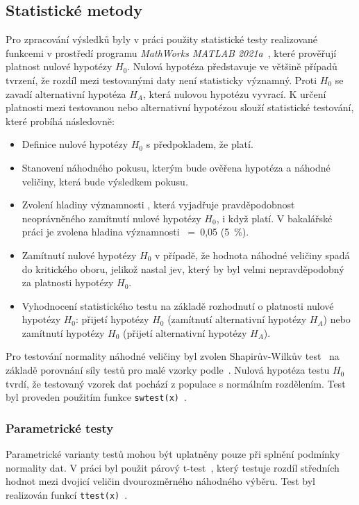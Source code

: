 \subsection{Statistické metody}
\label{section:statistical_methods}
Pro zpracování výsledků byly v práci použity statistické testy realizované
funkcemi v prostředí programu \textit{MathWorks MATLAB 2021a}~\cite{MATLAB},
které prověřují platnost nulové hypotézy $H_0$. Nulová hypotéza představuje ve
většině případů tvrzení, že rozdíl mezi testovanými daty není statisticky
významný. Proti $H_0$ se zavadí alternativní hypotéza $H_A$, která nulovou
hypotézu vyvrací. K určení platnosti mezi testovanou nebo alternativní hypotézou
slouží statistické testování, které probíhá následovně:
\begin{itemize}
    \item Definice nulové hypotézy $H_0$ s předpokladem, že platí.
    \item Stanovení náhodného pokusu, kterým bude ověřena hypotéza a náhodné
          veličiny, která bude výsledkem pokusu.
    \item Zvolení hladiny významnosti \textalpha, která vyjadřuje
          pravděpodobnost neoprávněného zamítnutí nulové hypotézy $H_0$, i když platí.
          V bakalářské práci je zvolena hladina významnosti \textalpha~=~0,05 (5~\%).
    \item Zamítnutí nulové hypotézy $H_0$ v případě, že hodnota náhodné veličiny
          spadá do kritického oboru, jelikož nastal jev, který by byl velmi
          nepravděpodobný za platnosti hypotézy $H_0$.
    \item Vyhodnocení statistického testu na základě rozhodnutí o platnosti
          nulové hypotézy $H_0$: přijetí hypotézy $H_0$ (zamítnutí alternativní
          hypotézy $H_A$) nebo zamítnutí hypotézy $H_0$ (přijetí alternativní
          hypotézy $H_A$).
\end{itemize}

Pro testování normality náhodné veličiny byl zvolen Shapirův-Wilkův
test~\cite{wikiSHAPIROWILK} na základě porovnání síly testů pro malé vzorky
podle~\cite{Razali2011}. Nulová hypotéza testu $H_0$ tvrdí, že testovaný vzorek
dat pochází z populace s normálním rozdělením. Test byl proveden použitím funkce
\texttt{swtest(x)}~\cite{matlabSWTEST}.

\subsubsection{Parametrické testy}
\label{section:parametric_tests}
Parametrické varianty testů mohou být uplatněny pouze při splnění podmínky
normality dat. V práci byl použit párový t-test~\cite{Henry2005}, který testuje
rozdíl středních hodnot mezi dvojicí veličin dvourozměrného náhodného výběru.
Test byl realizován funkcí \texttt{ttest(x)}~\cite{matlabTTEST}.